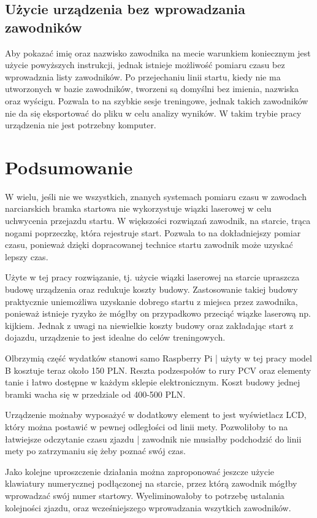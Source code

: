 \documentclass[11pt,a4paper, twoside]{article}
\begin{document}
\subsection{Użycie urządzenia bez wprowadzania zawodników}
Aby pokazać imię oraz nazwisko zawodnika na mecie warunkiem koniecznym jest użycie powyższych instrukcji, jednak istnieje możliwość pomiaru czasu bez wprowadznia listy zawodników. Po przejechaniu linii startu, kiedy nie ma utworzonych w bazie zawodników, tworzeni są domyślni bez imienia, nazwiska oraz wyścigu. Pozwala to na szybkie sesje treningowe, jednak takich zawodników nie da się eksportować do pliku w celu analizy wyników. W takim trybie pracy urządzenia nie jest potrzebny komputer.
\newpage
\section{Podsumowanie}
W wielu, jeśli nie we wszystkich, znanych systemach pomiaru czasu w zawodach narciarskich bramka startowa nie wykorzystuje wiązki laserowej w celu uchwycenia przejazdu startu. W większości rozwiązań zawodnik, na starcie, trąca nogami poprzeczkę, która rejestruje start. Pozwala to na dokładniejszy pomiar czasu, ponieważ dzięki dopracowanej technice startu zawodnik może uzyskać lepszy czas.

Użyte w tej pracy rozwiązanie, tj. użycie wiązki laserowej na starcie upraszcza budowę urządzenia oraz redukuje koszty budowy. Zastosowanie takiej budowy praktycznie uniemożliwa uzyskanie dobrego startu z miejsca przez zawodnika, ponieważ istnieje ryzyko że mógłby on przypadkowo przeciąć wiązke laserową np. kijkiem. Jednak z uwagi na niewielkie koszty budowy oraz zakładając start z dojazdu, urządzenie to jest idealne do celów treningowych.

Olbrzymią część wydatków stanowi samo Raspberry Pi | użyty w tej pracy model B kosztuje teraz około 150 PLN. Reszta podzespołów to rury PCV oraz elementy tanie i łatwo dostępne w każdym sklepie elektronicznym. Koszt budowy jednej bramki wacha się w przedziale od 400-500 PLN.

Urządzenie możnaby wyposażyć w dodatkowy element to jest wyświetlacz LCD, który można postawić w pewnej odległości od linii mety. Pozwoliłoby to na łatwiejsze odczytanie czasu zjazdu | zawodnik nie musiałby podchodzić do linii mety po zatrzymaniu się żeby poznać swój czas.

Jako kolejne uproszczenie działania można zaproponować jeszcze użycie klawiatury numerycznej podłączonej na starcie, przez którą zawodnik mógłby wprowadzać swój numer startowy. Wyeliminowałoby to potrzebę ustalania kolejności zjazdu, oraz wcześniejszego wprowadzania wszytkich zawodników.
\newpage
\end{document}
